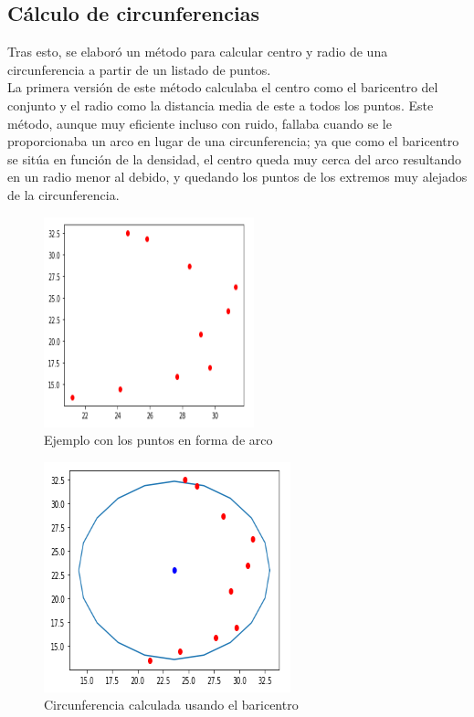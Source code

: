 \documentclass[conference,a4paper]{IEEEtran}
\begin{document}
\subsection{Cálculo de circunferencias}

Tras esto, se elaboró un método para calcular centro y radio de una circunferencia a partir de un listado de puntos.\\ 

La primera versión de este método calculaba el centro como el baricentro del conjunto y el radio como la distancia media de este a todos los puntos. Este método, aunque muy eficiente incluso con ruido, fallaba cuando se le proporcionaba un arco en lugar de una circunferencia; ya que como el baricentro se sitúa en función de la densidad, el centro queda muy cerca del arco resultando en un radio menor al debido, y quedando los puntos de los extremos muy alejados de la circunferencia.\\

\begin{figure}[H]
\centering
\includegraphics[scale=0.9]{ArcoBaricentro}
\caption{Ejemplo con los puntos en forma de arco}
\end{figure}

\begin{figure}[H]
\centering
\includegraphics[scale=0.8]{ArcoBaricentroResultado}
\caption{Circunferencia calculada usando el baricentro}
\end{figure}
\end{document}
